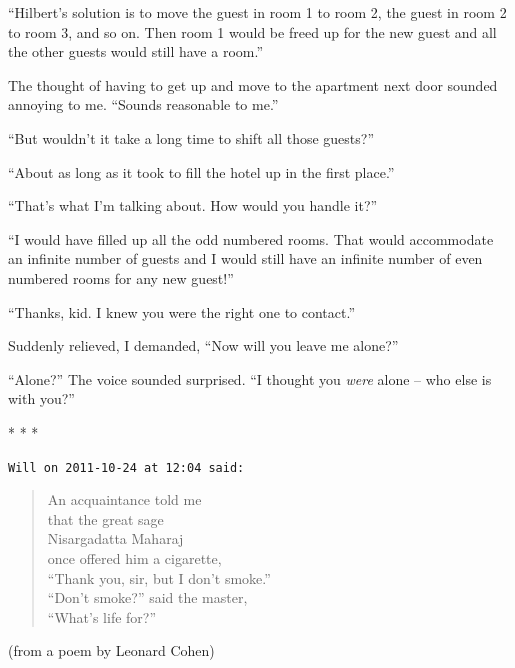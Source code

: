 ``Hilbert's solution is to move the guest in room 1 to room 2, the guest in room 2 to room 3, and so on. Then room 1 would be freed up for the new guest and all the other guests would still have a room.''

The thought of having to get up and move to the apartment next door sounded annoying to me. ``Sounds reasonable to me.''

``But wouldn't it take a long time to shift all those guests?''

``About as long as it took to fill the hotel up in the first place.''

``That's what I'm talking about. How would you handle it?''

``I would have filled up all the odd numbered rooms. That would accommodate an infinite number of guests and I would still have an infinite number of even numbered rooms for any new guest!''

``Thanks, kid. I knew you were the right one to contact.''

Suddenly relieved, I demanded, ``Now will you leave me alone?''

``Alone?'' The voice sounded surprised. ``I thought you \emph{were} alone -- who else is with you?''


\begin{center}* * *\end{center}

\begin{footnotesize}
\begin{sffamily}
\texttt{Will on 2011-10-24 at 12:04 said:}
\begin{verse}
An acquaintance told me\\
that the great sage\\
Nisargadatta Maharaj\\
once offered him a cigarette,\\
``Thank you, sir, but I don't smoke.''\\
``Don't smoke?'' said the master,\\
``What's life for?''
\end{verse}

(from a poem by Leonard Cohen)

\hfill

\end{sffamily}
\end{footnotesize}

